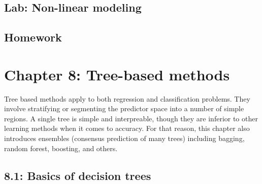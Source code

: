 \documentclass{article}
\begin{document}
\subsection*{Lab: Non-linear modeling}

\subsection*{Homework}

\section*{Chapter 8: Tree-based methods} 

Tree based methods apply to both regression and classification problems. They involve stratifying or segmenting the predictor space into a number of simple regions. A single tree is simple and interpreable, though they are inferior to other learning methods when it comes to accuracy. For that reason, this chapter also introduces ensembles (consensus prediction of many trees) including bagging, random forest, boosting, and others.

\subsection*{8.1: Basics of decision trees}
\end{document}
